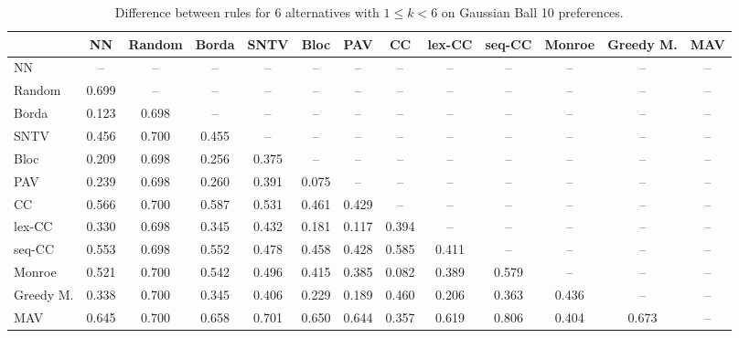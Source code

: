
\begin{table*}[htbp]
\centering
\begin{tabular}{lcccccccccccc}
\toprule
 & NN & Random & Borda & SNTV & Bloc & PAV & CC & lex-CC & seq-CC & Monroe & Greedy M. & MAV \\
\midrule
NN & -- & -- & -- & -- & -- & -- & -- & -- & -- & -- & -- & -- \\
Random & \cellcolor{blue!69} 0.699 & -- & -- & -- & -- & -- & -- & -- & -- & -- & -- & -- \\
Borda & \cellcolor{blue!12} 0.123 & \cellcolor{blue!69} 0.698 & -- & -- & -- & -- & -- & -- & -- & -- & -- & -- \\
SNTV & \cellcolor{blue!45} 0.456 & \cellcolor{blue!70} 0.700 & \cellcolor{blue!45} 0.455 & -- & -- & -- & -- & -- & -- & -- & -- & -- \\
Bloc & \cellcolor{blue!20} 0.209 & \cellcolor{blue!69} 0.698 & \cellcolor{blue!25} 0.256 & \cellcolor{blue!37} 0.375 & -- & -- & -- & -- & -- & -- & -- & -- \\
PAV & \cellcolor{blue!23} 0.239 & \cellcolor{blue!69} 0.698 & \cellcolor{blue!26} 0.260 & \cellcolor{blue!39} 0.391 & \cellcolor{blue!7} 0.075 & -- & -- & -- & -- & -- & -- & -- \\
CC & \cellcolor{blue!56} 0.566 & \cellcolor{blue!70} 0.700 & \cellcolor{blue!58} 0.587 & \cellcolor{blue!53} 0.531 & \cellcolor{blue!46} 0.461 & \cellcolor{blue!42} 0.429 & -- & -- & -- & -- & -- & -- \\
lex-CC & \cellcolor{blue!33} 0.330 & \cellcolor{blue!69} 0.698 & \cellcolor{blue!34} 0.345 & \cellcolor{blue!43} 0.432 & \cellcolor{blue!18} 0.181 & \cellcolor{blue!11} 0.117 & \cellcolor{blue!39} 0.394 & -- & -- & -- & -- & -- \\
seq-CC & \cellcolor{blue!55} 0.553 & \cellcolor{blue!69} 0.698 & \cellcolor{blue!55} 0.552 & \cellcolor{blue!47} 0.478 & \cellcolor{blue!45} 0.458 & \cellcolor{blue!42} 0.428 & \cellcolor{blue!58} 0.585 & \cellcolor{blue!41} 0.411 & -- & -- & -- & -- \\
Monroe & \cellcolor{blue!52} 0.521 & \cellcolor{blue!70} 0.700 & \cellcolor{blue!54} 0.542 & \cellcolor{blue!49} 0.496 & \cellcolor{blue!41} 0.415 & \cellcolor{blue!38} 0.385 & \cellcolor{blue!8} 0.082 & \cellcolor{blue!38} 0.389 & \cellcolor{blue!57} 0.579 & -- & -- & -- \\
Greedy M. & \cellcolor{blue!33} 0.338 & \cellcolor{blue!70} 0.700 & \cellcolor{blue!34} 0.345 & \cellcolor{blue!40} 0.406 & \cellcolor{blue!22} 0.229 & \cellcolor{blue!18} 0.189 & \cellcolor{blue!46} 0.460 & \cellcolor{blue!20} 0.206 & \cellcolor{blue!36} 0.363 & \cellcolor{blue!43} 0.436 & -- & -- \\
MAV & \cellcolor{blue!64} 0.645 & \cellcolor{blue!70} 0.700 & \cellcolor{blue!65} 0.658 & \cellcolor{blue!70} 0.701 & \cellcolor{blue!65} 0.650 & \cellcolor{blue!64} 0.644 & \cellcolor{blue!35} 0.357 & \cellcolor{blue!61} 0.619 & \cellcolor{blue!80} 0.806 & \cellcolor{blue!40} 0.404 & \cellcolor{blue!67} 0.673 & -- \\
\bottomrule
\end{tabular}

\caption{Difference between rules for 6 alternatives with $1 \leq k < 6$ on Gaussian Ball 10 preferences.}
\label{tab:rule_distance_heatmap-m=[6]-pref_dist=euclidean__args__dimensions=10_-_space=gaussian_ball}
\end{table*}
    